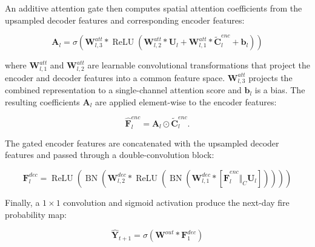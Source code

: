 \documentclass[sigconf]{acmart}
\begin{document}
An additive attention gate then computes spatial attention
coefficients from the upsampled decoder features and
corresponding encoder features:

\begin{equation}
\mathbf{A}_{l} =
\sigma\left(
\mathbf{W}_{l,3}^{att} *
\operatorname{ReLU}\left(
  \mathbf{W}_{l,2}^{att} * \mathbf{U}_{l}
  +
  \mathbf{W}_{l,1}^{att} * \widetilde{\mathbf{C}}^{enc}_{l}
  +
  \mathbf{b}_{l}
\right)
\right)
\label{eq:attention}
\end{equation}

where $\mathbf{W}_{l,1}^{att}$ and $\mathbf{W}_{l,2}^{att}$
are learnable convolutional transformations that project
the encoder and decoder features into a common feature space.
$\mathbf{W}_{l,3}^{att}$ projects the combined representation
to a single-channel attention score and $\mathbf{b}_{l}$ is a bias. 
The resulting coefficients $\mathbf{A}_{l}$ are applied element-wise to the encoder features:

\begin{equation}
\hat{\mathbf{F}}^{enc}_{l} =
\mathbf{A}_{l} \odot \widetilde{\mathbf{C}}^{enc}_{l}.
\label{eq:gatedfeatures}
\end{equation}

The gated encoder features are concatenated with the upsampled
decoder features and passed through a double-convolution block:

\begin{equation}
\mathbf{F}^{dec}_{l} =
\operatorname{ReLU}\left(
  \operatorname{BN}\left(
    \mathbf{W}_{l,2}^{dec} * \operatorname{ReLU}\left(
      \operatorname{BN}\left(
        \mathbf{W}_{l,1}^{dec} *
        \left[
          \hat{\mathbf{F}}^{enc}_{l}
          \Vert_C
          \mathbf{U}_{l}
        \right]
      \right)
    \right)
  \right)
\right)
\label{eq:decoding}
\end{equation}

Finally, a $1\times1$ convolution and sigmoid activation produce
the next-day fire probability map:

\begin{equation}
\widehat{\mathbf{Y}}_{t+1} =
\sigma\left(
\mathbf{W}^{out} * \mathbf{F}^{dec}_{1}
\right)
\label{eq:prediction}
\end{equation}
\end{document}
